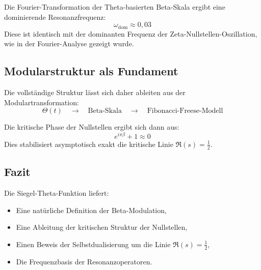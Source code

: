 Die Fourier-Transformation der Theta-basierten Beta-Skala ergibt eine dominierende Resonanzfrequenz:
\[
\omega_{\text{dom}} \approx 0{,}03
\]
Diese ist identisch mit der dominanten Frequenz der Zeta-Nullstellen-Oszillation, wie in der Fourier-Analyse gezeigt wurde.

\subsection{Modularstruktur als Fundament}

Die vollständige Struktur lässt sich daher ableiten aus der Modulartransformation:
\[
\Theta(t) \quad \longrightarrow \quad \text{Beta-Skala} \quad \longrightarrow \quad \text{Fibonacci-Freese-Modell}
\]

Die kritische Phase der Nullstellen ergibt sich dann aus:
\[
e^{i \pi \beta} + 1 \approx 0
\]
Dies stabilisiert asymptotisch exakt die kritische Linie \( \Re(s) = \frac{1}{2} \).

\subsection{Fazit}

Die Siegel-Theta-Funktion liefert:
\begin{itemize}
    \item Eine natürliche Definition der Beta-Modulation,
    \item Eine Ableitung der kritischen Struktur der Nullstellen,
    \item Einen Beweis der Selbstdualisierung um die Linie \( \Re(s) = \frac{1}{2} \),
    \item Die Frequenzbasis der Resonanzoperatoren.
\end{itemize}